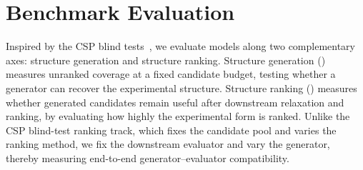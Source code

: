 \section{Benchmark Evaluation}
\label{sec:benchmarks}

Inspired by the CSP blind tests~\citep{hunnisett2024seventhranking,hunnisett2024seventhgeneration}, we evaluate models along two complementary axes: structure generation and structure ranking. Structure generation () measures unranked coverage at a fixed candidate budget, testing whether a generator can recover the experimental structure. Structure ranking () measures whether generated candidates remain useful after downstream relaxation and ranking, by evaluating how highly the experimental form is ranked. Unlike the CSP blind-test ranking track, which fixes the candidate pool and varies the ranking method, we fix the downstream evaluator and vary the generator, thereby measuring end-to-end generator--evaluator compatibility.




